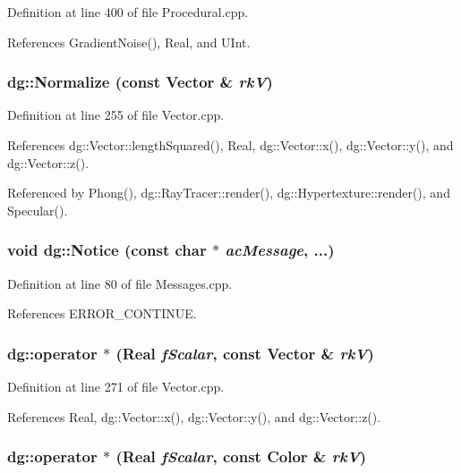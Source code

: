 Definition at line 400 of file Procedural.cpp.

References Gradient\-Noise(), Real, and UInt.
\subsubsection{ dg::Normalize (const {\bf Vector} \& {\em rk\-V})}\label{namespacedg_a186}




Definition at line 255 of file Vector.cpp.

References dg::Vector::length\-Squared(), Real, dg::Vector::x(), dg::Vector::y(), and dg::Vector::z().

Referenced by Phong(), dg::Ray\-Tracer::render(), dg::Hypertexture::render(), and Specular().
\subsubsection{\setlength{\rightskip}{0pt plus 5cm}void dg::Notice (const char $\ast$ {\em ac\-Message}, ...)\hspace{0.3cm}{\tt  [inline]}}\label{namespacedg_a122}




Definition at line 80 of file Messages.cpp.

References ERROR\_\-CONTINUE.
\subsubsection{ dg::operator $\ast$ ({\bf Real} {\em f\-Scalar}, const {\bf Vector} \& {\em rk\-V})}\label{namespacedg_a181}




Definition at line 271 of file Vector.cpp.

References Real, dg::Vector::x(), dg::Vector::y(), and dg::Vector::z().
\subsubsection{ dg::operator $\ast$ ({\bf Real} {\em f\-Scalar}, const {\bf Color} \& {\em rk\-V})}\label{namespacedg_a61}




